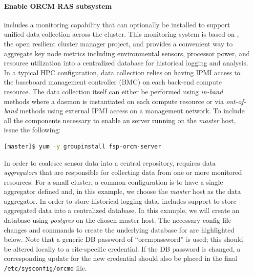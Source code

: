\documentclass[letterpaper]{article}
\begin{document}
\paragraph{Enable ORCM RAS subsystem} 

\FSP{} includes a monitoring capability that can optionally be installed to
support unified data collection across the cluster. This monitoring system is
based on \ORCM{}, the open resilient cluster manager project, and provides a
convenient way to aggregate key node metrics including environmental sensors,
processor power, and resource utilization into a centralized database for
historical logging and analysis.  In a typical HPC configuration, \ORCM{} data
collection relies on having IPMI access to the baseboard management controller
(BMC) on each back-end compute resource. The data collection itself can either
be performed using {\em in-band} methods where a daemon is instantiated on each
compute resource or via {\em out-of-band} methods using external IPMI access on
a management network. To include all the components necessary to enable an \ORCM{}
server running on the {\em master} host, issue the following:

\begin{lstlisting}[language=bash]
[master]$ yum -y groupinstall fsp-orcm-server
\end{lstlisting}

In order to coalesce sensor data into a central repository, \ORCM{} requires
data {\em aggregators} that are responsible for collecting data from one or
more monitored resources. For a small cluster, a common configuration is to
have a single aggregator defined and, in this example, we choose the {\em master} host
as the data aggregator. In order to store historical logging data, \ORCM{}
includes support to store aggregated data into a centralized database. In this
example, we will create an \ORCM{} database using {\em postgres} on the chosen
master host. The necessary config file changes and commands to create the
underlying database for \ORCM{} are highlighted below. Note that a generic DB
password of ``orcmpassword'' is used; this should be altered locally to a
site-specific credential. If the DB password is changed, a corresponding update
for the new credential should also be placed in the final
\texttt{/etc/sysconfig/orcmd} file.
\end{document}
